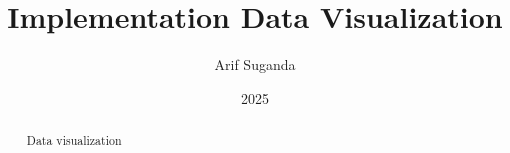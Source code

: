 \documentclass[a4paper,12pt]{article}
\title{Implementation Data Visualization}
\author{Arif Suganda}
\date{2025}
\begin{document}
\maketitle

\begin{abstract}
    Data visualization
\end{abstract}
\end{document}
